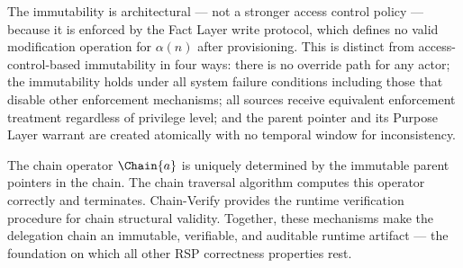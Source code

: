The immutability is architectural --- not a stronger access control policy --- because it is enforced by the Fact Layer write protocol, which defines no valid modification operation for $\alpha(n)$ after provisioning. This is distinct from access-control-based immutability in four ways: there is no override path for any actor; the immutability holds under all system failure conditions including those that disable other enforcement mechanisms; all sources receive equivalent enforcement treatment regardless of privilege level; and the parent pointer and its Purpose Layer warrant are created atomically with no temporal window for inconsistency.

The chain operator $\Chain{a}$ is uniquely determined by the immutable parent pointers in the chain. The chain traversal algorithm computes this operator correctly and terminates. Chain-Verify provides the runtime verification procedure for chain structural validity. Together, these mechanisms make the delegation chain an immutable, verifiable, and auditable runtime artifact --- the foundation on which all other RSP correctness properties rest.
